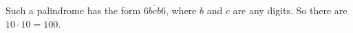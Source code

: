 Such a palindrome has the form $\overline{6bcb6}$, where $b$ and $c$ are any digits. So there are $10\cdot10=\boxed{100}$.

